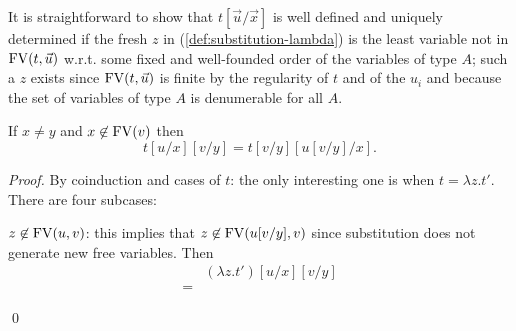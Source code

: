 It is straightforward to show that $t[\vec{u}/{\vec{x}}]$ is well defined and uniquely determined if the
fresh $z$ in (\ref{def:substitution-lambda}) is the least variable not in ${{\rm FV}}(t,\vec{u})$ w.r.t. some fixed and
well-founded order of the variables of type $A$; such a $z$ exists since ${{\rm FV}}(t,\vec{u})$ is finite by the regularity of $t$ and of the $u_i$ and
because the set of variables of type $A$ is denumerable for all $A$. 

\vspace{1mm}
\begin{lemma}\label{lem:substitution-composition} 
If $x\neq y$ and $x \not \in {{\rm FV}}(v)$ then 
\[t[u/x][v/y] = t[v/y][u[v/y]/x].\]

\end{lemma}

\begin{proof} By coinduction and cases of $t$: the only interesting one is when
$t = \lambda z.t'$. There are four subcases:

\noindent
$z \not\in {{\rm FV}}(u,v)$: this implies that $z \not\in {{\rm FV}}(u[v/y],v)$ since substitution
does not generate new free variables. Then
\[\begin{array}{lll}
& (\lambda z.t') [u/x][v/y] \\
= & 
\end{array}\]


%


%

  
 \qed
\end{proof}